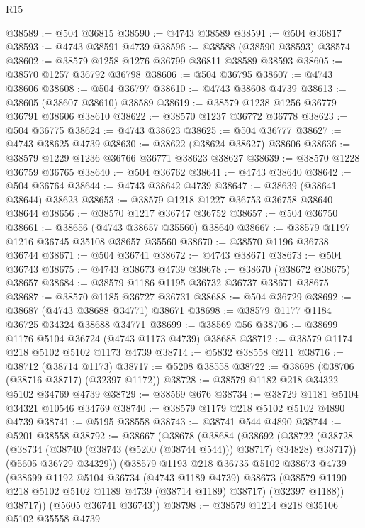 \begin{lexlean}{R15}
\begin{coremodule}
{{{{{{{{{{{@38589 := @504 @36815
@38590 := @4743 @38589
@38591 := @504 @36817
@38593 := @4743 @38591 @4739
@38596 := @38588 (@38590 @38593) @38574
@38602 := @38579 @1258 @1276 @36799 @36811 @38589 @38593
@38605 := @38570 @1257 @36792 @36798
@38606 := @504 @36795
@38607 := @4743 @38606
@38608 := @504 @36797
@38610 := @4743 @38608 @4739
@38613 := @38605 (@38607 @38610) @38589
@38619 := @38579 @1238 @1256 @36779 @36791 @38606 @38610
@38622 := @38570 @1237 @36772 @36778
@38623 := @504 @36775
@38624 := @4743 @38623
@38625 := @504 @36777
@38627 := @4743 @38625 @4739
@38630 := @38622 (@38624 @38627) @38606
@38636 := @38579 @1229 @1236 @36766 @36771 @38623 @38627
@38639 := @38570 @1228 @36759 @36765
@38640 := @504 @36762
@38641 := @4743 @38640
@38642 := @504 @36764
@38644 := @4743 @38642 @4739
@38647 := @38639 (@38641 @38644) @38623
@38653 := @38579 @1218 @1227 @36753 @36758 @38640 @38644
@38656 := @38570 @1217 @36747 @36752
@38657 := @504 @36750
@38661 := @38656 (@4743 @38657 @35560) @38640
@38667 := @38579 @1197 @1216 @36745 @35108 @38657 @35560
@38670 := @38570 @1196 @36738 @36744
@38671 := @504 @36741
@38672 := @4743 @38671
@38673 := @504 @36743
@38675 := @4743 @38673 @4739
@38678 := @38670 (@38672 @38675) @38657
@38684 := @38579 @1186 @1195 @36732 @36737 @38671 @38675
@38687 := @38570 @1185 @36727 @36731
@38688 := @504 @36729
@38692 := @38687 (@4743 @38688 @34771) @38671
@38698 := @38579 @1177 @1184 @36725 @34324 @38688 @34771
@38699 := @38569 @56
@38706 := @38699 @1176 @5104 @36724 (@4743 @1173 @4739) @38688
@38712 := @38579 @1174 @218 @5102 @5102 @1173 @4739
@38714 := @5832 @38558 @211
@38716 := @38712 (@38714 @1173)
@38717 := @5208 @38558
@38722 := @38698 (@38706 (@38716 @38717) (@32397 @1172))
@38728 := @38579 @1182 @218 @34322 @5102 @34769 @4739
@38729 := @38569 @676
@38734 := @38729 @1181 @5104 @34321 @10546 @34769
@38740 := @38579 @1179 @218 @5102 @5102 @4890 @4739
@38741 := @5195 @38558
@38743 := @38741 @544 @4890
@38744 := @5201 @38558
@38792 := @38667
    (@38678
      (@38684
        (@38692
          (@38722 (@38728 (@38734 (@38740 (@38743 (@5200 (@38744 @544))) @38717) @34828) @38717))
          (@5605 @36729 @34329))
        (@38579
          @1193
          @218
          @36735
          @5102
          @38673
          @4739
          (@38699
            @1192
            @5104
            @36734
            (@4743 @1189 @4739)
            @38673
            (@38579 @1190 @218 @5102 @5102 @1189 @4739 (@38714 @1189) @38717)
            (@32397 @1188))
          @38717))
      (@5605 @36741 @36743))
@38798 := @38579 @1214 @218 @35106 @5102 @35558 @4739
}}}}}}}}}}}
\end{coremodule}
\end{lexlean}
